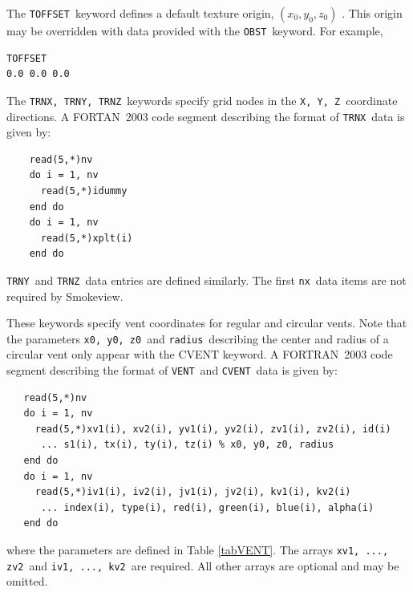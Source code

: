 \documentclass[11pt,twoside]{book}
\newcommand{\hitem}[1]{\item[{\bf #1} \hfill]}
\begin{document}
\hitem{TOFFSET}The {\tt TOFFSET}\ keyword defines a default texture origin, $(x_0, y_0, z_0)$ .
This origin may be overridden with data provided with the {\tt OBST}\ keyword. For example,

\begin{lstlisting}
TOFFSET
0.0 0.0 0.0
\end{lstlisting}

\hitem{TRNX,TRNY,TRNZ}The {\tt TRNX, TRNY, TRNZ}\ keywords specify
grid nodes in the {\tt X, Y, Z}\ coordinate directions.  A
FORTAN~2003 code segment describing the format of {\tt TRNX}\ data
is given by:
\begin{lstlisting}
    read(5,*)nv
    do i = 1, nv
      read(5,*)idummy
    end do
    do i = 1, nv
      read(5,*)xplt(i)
    end do
\end{lstlisting}
{\tt TRNY}\ and {\tt TRNZ}\ data entries are defined similarly. The
first {\tt nx}\ data items are not required by Smokeview.

\hitem{VENT, CVENT}These keywords specify vent coordinates for regular and circular vents.
Note that the parameters {\tt x0, y0, z0}\ and {\tt radius}\ describing the center and radius
of a circular vent
only appear with the CVENT keyword.
A FORTRAN~2003
code segment describing the format of {\tt VENT}\ and {\tt CVENT}\ data is given by:
\begin{lstlisting}
   read(5,*)nv
   do i = 1, nv
     read(5,*)xv1(i), xv2(i), yv1(i), yv2(i), zv1(i), zv2(i), id(i)
      ... s1(i), tx(i), ty(i), tz(i) % x0, y0, z0, radius
   end do
   do i = 1, nv
     read(5,*)iv1(i), iv2(i), jv1(i), jv2(i), kv1(i), kv2(i)
      ... index(i), type(i), red(i), green(i), blue(i), alpha(i)
   end do
\end{lstlisting}
where the parameters are defined in Table \ref{tabVENT}.
The arrays {\tt xv1,  ..., zv2}\ and {\tt iv1, ..., kv2}\ are
required. All other arrays are optional and may be omitted.
\end{document}
